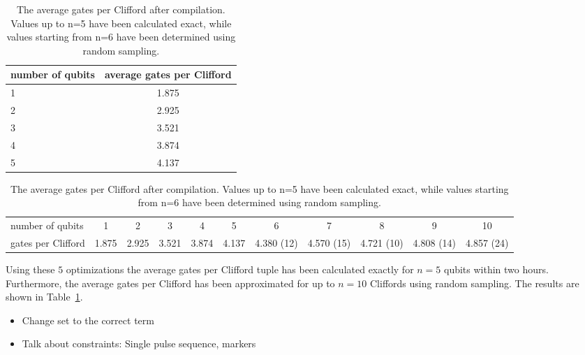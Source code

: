       \begin{table}
        \begin{tabular}{l c}
          \toprule
          number of qubits  & average gates per Clifford \\
          \midrule
          1 & 1.875 \\
          2 & 2.925 \\
          3 & 3.521 \\
          4 & 3.874 \\
          5 & 4.137 \\
          \bottomrule
        \end{tabular}
        \caption{The average gates per Clifford after compilation. Values up to n=5 have been calculated exact, while values starting from n=6 have been determined using random sampling.}
        \label{tab:gates per Clifford}
      \end{table}


      \begin{table}
        \begin{tabular}{l c c c c c c c c c c }
          number of qubits & 1 & 2 & 3 & 4 & 5 & 6 & 7 & 8 & 9 & 10 \\
          gates per Clifford & 1.875 & 2.925 & 3.521 & 3.874 & 4.137 & 4.380 (12)& 4.570 (15)& 4.721 (10)& 4.808 (14)& 4.857 (24) \\
        \end{tabular}
        \caption{The average gates per Clifford after compilation. Values up to n=5 have been calculated exact, while values starting from n=6 have been determined using random sampling.}
      \end{table}

      Using these $5$ optimizations the average gates per Clifford tuple has been calculated exactly for $n=5$ qubits within two hours. Furthermore, the average gates per Clifford has been approximated for up to $n=10$ Cliffords using random sampling. The results are shown in Table~\ref{tab:gates per Clifford}.

    \begin{itemize}
      \item Change set to the correct term
      \item Talk about constraints: Single pulse sequence, markers
    \end{itemize}